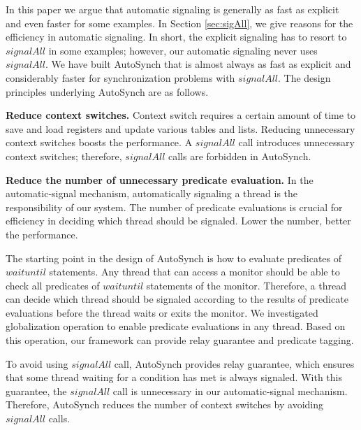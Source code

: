 \documentclass[preprint]{sigplanconf}
\begin{document}
In this paper we argue that automatic signaling is generally as fast as explicit 
and even faster for some examples. In Section \ref{sec:sigAll}, we give reasons
for the efficiency in automatic signaling. In short, the explicit signaling has 
to resort to $signalAll$ in some examples; however, our automatic signaling never 
uses $signalAll$. We have built AutoSynch that is almost always as 
fast as explicit and considerably faster for synchronization problems with 
$signalAll$. The design principles underlying AutoSynch are as follows.

\begin{description}
    \item{\bf Reduce context switches.} Context switch requires a certain 
        amount of time to save and load registers and update various tables and
        lists. Reducing unnecessary context switches boosts the performance.
        A $signalAll$ call introduces unnecessary context switches; therefore,
        $signalAll$ calls are forbidden in AutoSynch. 
    \item {\bf Reduce the number of unnecessary predicate evaluation.} In the 
        automatic-signal mechanism, automatically signaling a thread is the 
        responsibility of our system. The number of predicate evaluations is 
        crucial for efficiency in deciding which thread should be signaled. 
        Lower the number, better the performance.
\end{description}


The starting point in the design of AutoSynch is how to evaluate predicates of
$waituntil$ statements. Any thread that can access a monitor should be able
to check all predicates of $waituntil$ statements of the monitor. Therefore, a 
thread can decide which thread should be signaled according to the results of
predicate evaluations before the thread waits or exits the monitor. We 
investigated globalization operation to enable predicate evaluations in any 
thread. Based on this operation, our framework can provide relay guarantee and 
predicate tagging. 

To avoid using $signalAll$ call, AutoSynch 
provides relay guarantee, which ensures that some thread waiting for a
condition has met is always signaled. With this guarantee, the $signalAll$ call 
is unnecessary in our automatic-signal mechanism. Therefore, AutoSynch reduces 
the number of context switches by avoiding $signalAll$ calls. 
\end{document}
